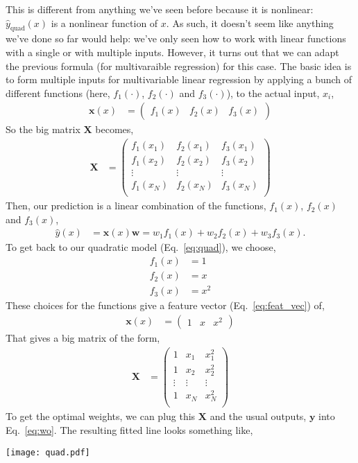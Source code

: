 \documentclass{article}
\newcommand{\yh}{\hat{y}}
\newcommand{\x}{\mathbf{x}}
\newcommand{\y}{\mathbf{y}}
\newcommand{\X}{\mathbf{X}}
\newcommand{\w}{\mathbf{w}}
\begin{document}
This is different from anything we've seen before because it is nonlinear: $\yh_\text{quad}(x)$ is a nonlinear function of $x$.
As such, it doesn't seem like anything we've done so far would help: we've only seen how to work with linear functions with a single or with multiple inputs.
However, it turns out that we can adapt the previous formula (for multivaraible regression) for this case.
The basic idea is to form multiple inputs for multivariable linear regression by applying a bunch of different functions (here, $f_1(\cdot)$, $f_2(\cdot)$ and $f_3(\cdot)$), to the actual input, $x_i$,
\begin{align}
  \label{eq:feat_vec}
  \x(x) &= \begin{pmatrix} f_1(x) & f_2(x) & f_3(x) \end{pmatrix}
\end{align}
So the big matrix $\X$ becomes,
\begin{align}
  \X &= \begin{pmatrix}
    f_1(x_1) & f_2(x_1) & f_3(x_1)\\
    f_1(x_2) & f_2(x_2) & f_3(x_2)\\
    \vdots & \vdots & \vdots\\
    f_1(x_N) & f_2(x_N) & f_3(x_N)\\
  \end{pmatrix}
\end{align}
Then, our prediction is a linear combination of the functions, $f_1(x)$, $f_2(x)$ and $f_3(x)$,
\begin{align}
  \label{eq:nonlin_yh}
  \yh(x) &= \x(x) \w = w_1 f_1(x) + w_2 f_2(x) + w_3 f_3(x).
\end{align}
To get back to our quadratic model (Eq.~\ref{eq:quad}), we choose,
\begin{align}
  f_1(x) &= 1\\
  f_2(x) &= x\\
  f_3(x) &= x^2
\end{align}
These choices for the functions give a feature vector (Eq.~\ref{eq:feat_vec}) of,
\begin{align}
  \x(x) &= \begin{pmatrix} 1 & x & x^2 \end{pmatrix}
\end{align}
That gives a big matrix of the form,
\begin{align}
  \X &= \begin{pmatrix}
    1 & x_1 & x_1^2\\
    1 & x_2 & x_2^2\\
    \vdots & \vdots & \vdots\\
    1 & x_N & x_N^2\\
  \end{pmatrix}
\end{align}
To get the optimal weights, we can plug this $\X$ and the usual outputs, $\y$ into Eq.~\eqref{eq:wo}.
The resulting fitted line looks something like,
\begin{center}
  \texttt{[image: quad.pdf]}
\end{center}
\end{document}
